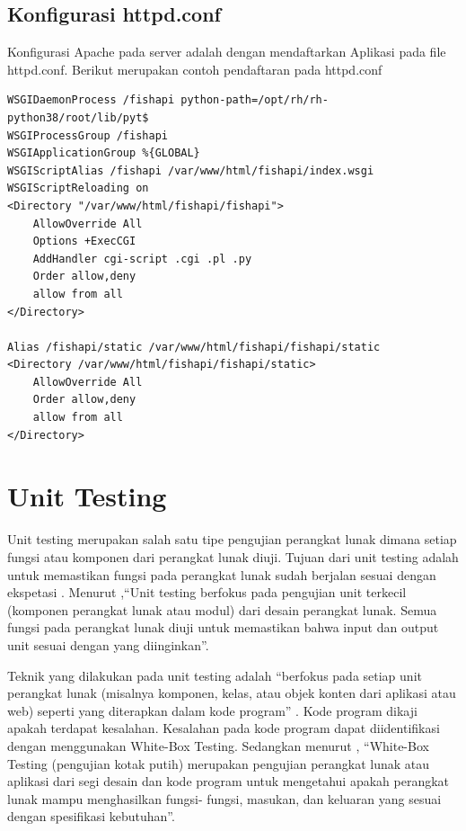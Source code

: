 	\subsection{Konfigurasi httpd.conf}
	
		Konfigurasi Apache pada server adalah dengan mendaftarkan Aplikasi pada file httpd.conf. Berikut merupakan contoh pendaftaran pada httpd.conf

\begin{lstlisting}
WSGIDaemonProcess /fishapi python-path=/opt/rh/rh-python38/root/lib/pyt$
WSGIProcessGroup /fishapi
WSGIApplicationGroup %{GLOBAL}
WSGIScriptAlias /fishapi /var/www/html/fishapi/index.wsgi
WSGIScriptReloading on
<Directory "/var/www/html/fishapi/fishapi">
	AllowOverride All
	Options +ExecCGI
	AddHandler cgi-script .cgi .pl .py
	Order allow,deny
	allow from all
</Directory>

Alias /fishapi/static /var/www/html/fishapi/fishapi/static
<Directory /var/www/html/fishapi/fishapi/static>
	AllowOverride All
	Order allow,deny
	allow from all
</Directory>
\end{lstlisting}
		
\section{Unit Testing}
Unit testing merupakan salah satu tipe pengujian perangkat lunak dimana setiap fungsi atau komponen dari perangkat lunak diuji. Tujuan dari unit testing adalah untuk memastikan fungsi pada perangkat lunak sudah berjalan sesuai dengan ekspetasi \citep{hamilton2022unittesting}. Menurut \citep{rosa2016rekayasa},“Unit testing berfokus pada pengujian unit terkecil (komponen perangkat lunak atau modul) dari desain perangkat lunak. Semua fungsi pada perangkat lunak diuji untuk memastikan bahwa input dan output unit sesuai dengan yang diinginkan”.

Teknik yang dilakukan pada unit testing adalah “berfokus pada setiap unit perangkat lunak (misalnya komponen, kelas, atau objek konten dari aplikasi atau web) seperti yang diterapkan dalam kode program” \citep{pressman2012}. Kode program dikaji apakah terdapat kesalahan. Kesalahan pada kode program dapat diidentifikasi dengan menggunakan White-Box Testing. Sedangkan menurut \citep{rosa2016rekayasa}, “White-Box Testing (pengujian kotak putih) merupakan pengujian perangkat lunak atau aplikasi dari segi desain dan kode program untuk mengetahui apakah perangkat lunak mampu menghasilkan fungsi- fungsi, masukan, dan keluaran yang sesuai dengan spesifikasi kebutuhan”.

